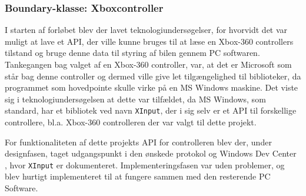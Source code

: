 \subsubsection{Boundary-klasse: Xboxcontroller} \label{sec:controller}
I starten af forløbet blev der lavet teknologiundersøgelser, for hvorvidt det var muligt at lave et API, der ville kunne bruges til at læse en Xbox-360 controllers tilstand og bruge denne data til styring af bilen gennem PC softwaren. 
Tankegangen bag valget af en Xbox-360 controller, var, at det er Microsoft som står bag denne controller og dermed ville give let tilgængelighed til biblioteker, da programmet som hovedpointe skulle virke på en MS Windows maskine. 
Det viste sig i teknologiundersøgelsen at dette var tilfældet, da MS Windows, som standard, har et bibliotek ved navn \texttt{XInput}, der i sig selv er et API til forskellige controllere, bl.a. Xbox-360 controlleren der var valgt til dette projekt.

For funktionaliteten af dette projekts API for controlleren blev der, under designfasen, taget udgangspunkt i den ønskede protokol og Windows Dev Center \cite{lib:windows_xinput}, hvor \texttt{XInput} er dokumenteret. 
Implementeringsfasen var uden problemer, og blev hurtigt implementeret til at fungere sammen med den resterende PC Software.